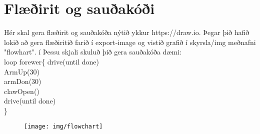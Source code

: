 \section{Flæðirit og sauðakóði}Hér skal gera flæðirit og sauðakóða nýtið ykkur https://draw.io. Þegar þið hafið lokið að gera flæðiritið farið í export-image og vistið grafið í skyrsla/img meðnafni "flowhart". í Þessu skjali skuluð þið gera sauðakóða 
dæmi:\\
loop forewer\{
  drive(until done)\\
  ArmUp(30)\\
  armDon(30)\\
  clawOpen()\\
  drive(until done)\\
\}
\begin{figure}[h]
\texttt{[image: img/flowchart]}
\end{figure}
